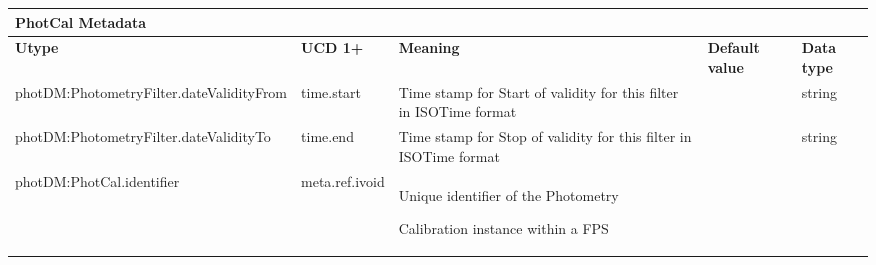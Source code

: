 \documentclass[11pt,a4paper]{ivoa}
\begin{document}
\begin{appendices}



\newpage



\begin{table}[H]
\centering
\begin{adjustbox}{angle=90}
\begin{tabular}{p{3in}p{0.87in}p{2in}p{1in}p{0.25in}}
\multicolumn{5}{p{\dimexpr6.59in+8\tabcolsep\relax}}{\centering 
{\fontsize{10pt}{12.0pt}\selectfont \textbf{PhotCal Metadata}}} \\
\hline
\multicolumn{1}{p{3in}}{{\fontsize{8pt}{8pt}\selectfont \textbf{Utype}}} &
\multicolumn{1}{p{0.87in}}{{\fontsize{8pt}{8pt}\selectfont \textbf{UCD 1+}}} &
\multicolumn{1}{p{2in}}{{\fontsize{8pt}{8pt}\selectfont \textbf{Meaning}}} &
\multicolumn{1}{p{1in}}{{\fontsize{8pt}{8pt}\selectfont \textbf{Default value}}} &
\multicolumn{1}{p{0.25in}}{{\fontsize{8pt}{8pt}\selectfont \textbf{Data type}}} \\
\hline
\multicolumn{1}{p{3in}}{{\fontsize{8pt}{8pt}\selectfont photDM:PhotometryFilter.dateValidityFrom}} &
\multicolumn{1}{p{0.87in}}{{\fontsize{8pt}{8pt}\selectfont time.start}} &
\multicolumn{1}{p{2in}}{{\fontsize{8pt}{8pt}\selectfont Time stamp for Start of validity for 
this filter in ISOTime format }} &
\multicolumn{1}{p{1in}}{} &
\multicolumn{1}{p{0.25in}}{{\fontsize{8pt}{8pt}\selectfont string }} \\
\hline
\multicolumn{1}{p{3in}}{{\fontsize{8pt}{8pt}
\selectfont photDM:PhotometryFilter.dateValidityTo}} &
\multicolumn{1}{p{0.87in}}{{\fontsize{8pt}{8pt}\selectfont time.end}} &
\multicolumn{1}{p{2in}}{{\fontsize{8pt}{8pt}\selectfont Time stamp for Stop of validity 
for this filter in ISOTime format }} &
\multicolumn{1}{p{1in}}{} &
\multicolumn{1}{p{0.25in}}{{\fontsize{8pt}{8pt}\selectfont string }} \\
\hline
\multicolumn{1}{p{3in}}{{\fontsize{8pt}{8pt}\selectfont photDM:PhotCal.identifier}} &
\multicolumn{1}{p{0.87in}}{{\fontsize{8pt}{8pt}\selectfont meta.ref.ivoid }} &
\multicolumn{1}{p{2in}}{{\fontsize{8pt}{8pt}\selectfont Unique identifier of the Photometry } 
\par {\fontsize{8pt}{8pt}\selectfont Calibration instance within a FPS}} &

\end{tabular}
\end{adjustbox}
\end{table}
\end{appendices}
\end{document}
